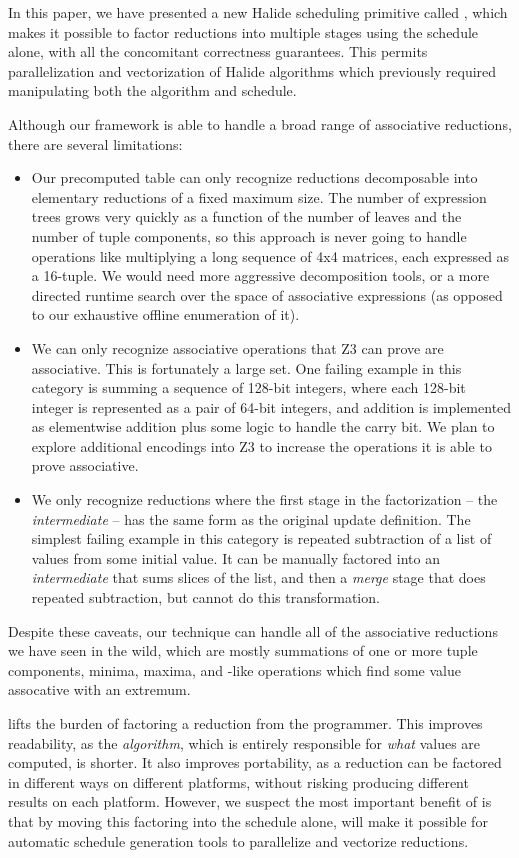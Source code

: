 In this paper, we have presented a new Halide scheduling primitive called , which makes it possible to factor reductions into multiple stages using the schedule alone, with all the concomitant correctness guarantees. This permits parallelization and vectorization of Halide algorithms which previously required manipulating both the algorithm and schedule.

Although our framework is able to handle a broad range of associative reductions, there are several limitations:

\begin{itemize}
\item Our precomputed table can only recognize reductions decomposable into elementary reductions of a fixed maximum size. The number of expression trees grows very quickly as a function of the number of leaves and the number of tuple components, so this approach is never going to handle operations like multiplying a long sequence of 4x4 matrices, each expressed as a 16-tuple. We would need more aggressive decomposition tools, or a more directed runtime search over the space of associative expressions (as opposed to our exhaustive offline enumeration of it).
\item We can only recognize associative operations that Z3 can prove are associative. This is fortunately a large set. One failing example in this category is summing a sequence of 128-bit integers, where each 128-bit integer is represented as a pair of 64-bit integers, and addition is implemented as elementwise addition plus some logic to handle the carry bit.  We plan to explore additional encodings into Z3 to increase the operations it is able to prove associative.
\item We only recognize reductions where the first stage in the factorization -- the \emph{intermediate} -- has the same form as the original update definition. The simplest failing example in this category is repeated subtraction of a list of values from some initial value. It can be manually factored into an \emph{intermediate} that sums slices of the list, and then a \emph{merge} stage that does repeated subtraction, but  cannot do this transformation.
\end{itemize}

Despite these caveats, our technique can handle all of the associative reductions we have seen in the wild, which are mostly summations of one or more tuple components, minima, maxima, and -like operations which find some value assocative with an extremum.

 lifts the burden of factoring a reduction from the programmer. This improves readability, as the \emph{algorithm}, which is entirely responsible for \emph{what} values are computed, is shorter. It also improves portability, as a reduction can be factored in different ways on different platforms, without risking producing different results on each platform. However, we suspect the most important benefit of  is that by moving this factoring into the schedule alone,  will make it possible for automatic schedule generation tools to parallelize and vectorize reductions.

